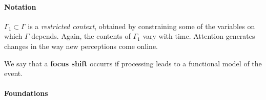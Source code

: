 \paragraph{\textbf{\upshape Notation}}

$\Gamma_1 \subset \Gamma$ is a \emph{restricted context}, obtained by
constraining some of the variables on which $\Gamma$ depends.  Again,
the contents of $\Gamma_1$ vary with time.  Attention generates
changes in the way new perceptions come online.

\begin{defn}\label{def:interest}
\hypertarget{def:interest}{} We say that a \textbf{focus shift}
occurrs if processing leads to a functional model of the event.
\end{defn}


\paragraph{\textbf{\upshape Foundations}}
                                         
